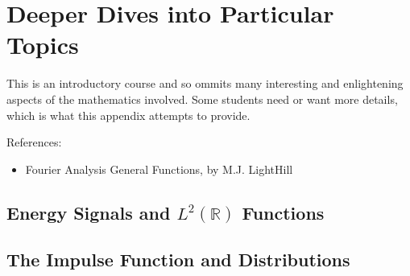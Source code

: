 \chapter{Deeper Dives into Particular Topics}

This is an introductory course and so ommits many interesting and enlightening aspects of the mathematics involved. Some students need or want more details, which is what this appendix attempts to provide.

References:

\begin{itemize}
\item Fourier Analysis General Functions, by M.J. LightHill
\end{itemize}

\section{Energy Signals and $L^2(\mathbb{R})$ Functions}

\section{The Impulse Function and Distributions}



